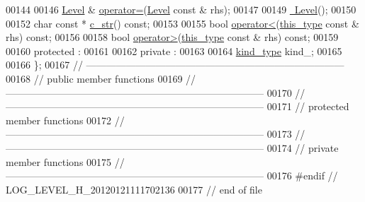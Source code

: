 \begin{DoxyCode}
00144 
00146     \hyperlink{classhryky_1_1log_1_1_level}{Level} & \hyperlink{classhryky_1_1log_1_1_level_ad7e9458e5590f0dc233c3f74f3ef0fc8}{operator=}(\hyperlink{classhryky_1_1log_1_1_level}{Level} \textcolor{keyword}{const} & rhs);
00147 
00149     \hyperlink{classhryky_1_1log_1_1_level_a7384e672659038dc87f0963634dc68a0}{~Level}();
00150 
00152     \textcolor{keywordtype}{char} \textcolor{keyword}{const} * \hyperlink{classhryky_1_1log_1_1_level_ab1e3f9df6c97b0afcb99a9967663be6c}{c_str}() \textcolor{keyword}{const};
00153 
00155     \textcolor{keywordtype}{bool} \hyperlink{classhryky_1_1log_1_1_level_a928952372bb99d04076e8f28bad73576}{operator<}(\hyperlink{classhryky_1_1log_1_1_level_a2a7ccc2d552dfdf72dc1d543e18c4780}{this_type} \textcolor{keyword}{const} & rhs) \textcolor{keyword}{const};
00156 
00158     \textcolor{keywordtype}{bool} \hyperlink{classhryky_1_1log_1_1_level_a4c466927aa1adcbae2adb0c274bd3345}{operator>}(\hyperlink{classhryky_1_1log_1_1_level_a2a7ccc2d552dfdf72dc1d543e18c4780}{this_type} \textcolor{keyword}{const} & rhs) \textcolor{keyword}{const};
00159 
00160 \textcolor{keyword}{protected} :
00161 
00162 \textcolor{keyword}{private} :
00163 
00164     \hyperlink{classhryky_1_1log_1_1_level_a9e6bba8f272859b212f49e4478a863d7}{kind_type}   kind\_;
00165 
00166 \};
00167 \textcolor{comment}{//
      ------------------------------------------------------------------------------}
00168 \textcolor{comment}{// public member functions}
00169 \textcolor{comment}{//
      ------------------------------------------------------------------------------}
00170 \textcolor{comment}{//
      ------------------------------------------------------------------------------}
00171 \textcolor{comment}{// protected member functions}
00172 \textcolor{comment}{//
      ------------------------------------------------------------------------------}
00173 \textcolor{comment}{//
      ------------------------------------------------------------------------------}
00174 \textcolor{comment}{// private member functions}
00175 \textcolor{comment}{//
      ------------------------------------------------------------------------------}
00176 \textcolor{preprocessor}{#endif // LOG\_LEVEL\_H\_20120121111702136}
00177 \textcolor{preprocessor}{}\textcolor{comment}{// end of file}
\end{DoxyCode}
